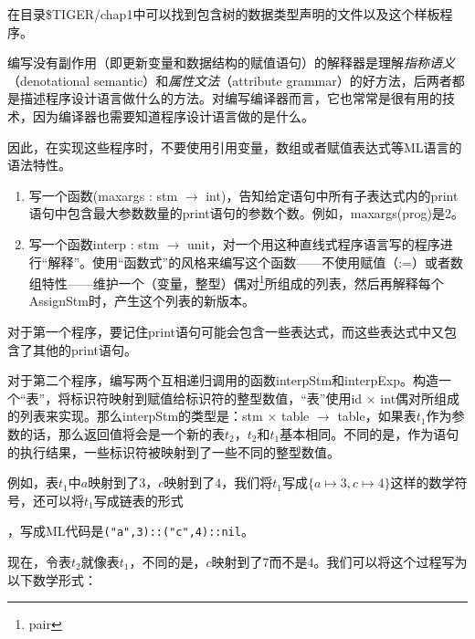 \documentclass[cn,11pt,chinese]{elegantbook}
\begin{document}
在目录\$TIGER/chap1中可以找到包含树的数据类型声明的文件以及这个样板程序。

编写没有副作用（即更新变量和数据结构的赋值语句）的解释器是理解\textit{指称语义}（denotational semantic）和\textit{属性文法}（attribute grammar）的好方法，后两者都是描述程序设计语言做什么的方法。对编写编译器而言，它也常常是很有用的技术，因为编译器也需要知道程序设计语言做的是什么。

因此，在实现这些程序时，不要使用引用变量，数组或者赋值表达式等ML语言的语法特性。

\begin{enumerate}
  \item 写一个函数(maxargs : stm $\rightarrow$ int)，告知给定语句中所有子表达式内的print语句中包含最大参数数量的print语句的参数个数。例如，maxargs(prog)是2。
  \item 写一个函数interp : stm $\rightarrow$ unit，对一个用这种直线式程序语言写的程序进行“解释”。使用“函数式”的风格来编写这个函数——不使用赋值（:=）或者数组特性——维护一个（变量，整型）偶对\footnote{pair}所组成的列表，然后再解释每个AssignStm时，产生这个列表的新版本。
\end{enumerate}

对于第一个程序，要记住print语句可能会包含一些表达式，而这些表达式中又包含了其他的print语句。

对于第二个程序，编写两个互相递归调用的函数interpStm和interpExp。构造一个“表”，将标识符映射到赋值给标识符的整型数值，“表”使用id $\times$ int偶对所组成的列表来实现。那么interpStm的类型是：stm $\times$ table $\rightarrow$ table，如果表$t_1$作为参数的话，那么返回值将会是一个新的表$t_2$，$t_2$和$t_1$基本相同。不同的是，作为语句的执行结果，一些标识符被映射到了一些不同的整型数值。

例如，表$t_1$中$a$映射到了$3$，$c$映射到了$4$，我们将$t_1$写成$\{a \mapsto 3,c \mapsto 4\}$这样的数学符号，还可以将$t_1$写成链表的形式
，写成ML代码是\texttt{("a",3)::("c",4)::nil}。

现在，令表$t_2$就像表$t_1$，不同的是，$c$映射到了$7$而不是$4$。我们可以将这个过程写为以下数学形式：
\end{document}
